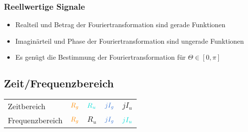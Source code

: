 \documentclass[a4paper, 12pt]{article}
\begin{document}
\subsubsection{Reellwertige Signale}

\begin{itemize}
    \item Realteil und Betrag der Fouriertransformation sind gerade Funktionen
    \item Imaginärteil und Phase der Fouriertransformation sind ungerade Funktionen
    \item Es genügt die Bestimmung der Fouriertransformation für $Θ ∈ [0,π]$
\end{itemize}

\subsection{Zeit/Frequenzbereich}

\begin{tabular}{lllll}
    Zeitbereich &
    $\color{orange} R_g$  &
    $\color{turquoise} R_u$  &
    $\color{bluegray} jI_g$ &
    $jI_u$\\

    Frequenzbereich &
    $\color{orange} R_g$  &
    $R_u$  &
    $\color{bluegray}jI_g$ &
    $\color{turquoise}jI_u$\\
\end{tabular}
\end{document}
